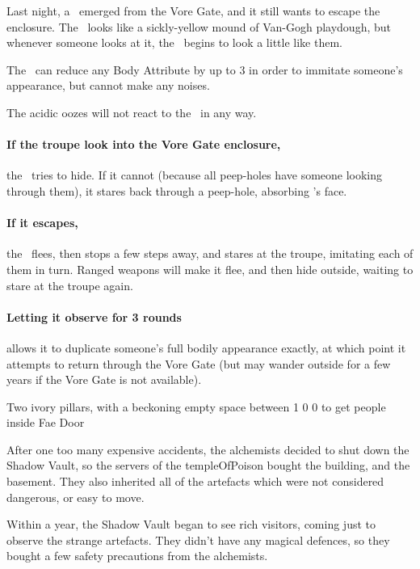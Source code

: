 \setcounter{statDots}{0}
Last night, a \superWierdzi\ emerged from the Vore Gate, and it still wants to escape the enclosure.
The \superWierdzi\ looks like a sickly-yellow mound of Van-Gogh playdough, but whenever someone looks at it, the \superWierdzi\ begins to look a little like them.

\mphlg

The \superWierdzi\ can reduce any Body Attribute by up to 3 in order to immitate someone's appearance, but cannot make any noises.

The acidic oozes will not react to the \superWierdzi\ in any way.

\paragraph{If the troupe look into the Vore Gate enclosure,}
the \superWierdzi\ tries to hide.
If it cannot (because all peep-holes have someone looking through them), it stares back through a peep-hole, absorbing 's face.

\paragraph{If it escapes,}
the \superWierdzi\ flees, then stops a few steps away, and stares at the troupe, imitating each of them in turn.
Ranged weapons will make it flee, and then hide outside, waiting to stare at the troupe again.

\paragraph{Letting it observe for 3 rounds}
allows it to duplicate someone's full bodily appearance exactly, at which point it attempts to return through the Vore Gate (but may wander outside for a few years if the Vore Gate is not available).

  {Two ivory pillars, with a beckoning empty space between}%
  {1}%
  {0}%
  {0}%
  {to get people inside}%
  {Fae Door}%
  {
    \setcounter{Fire}{3}
    \setcounter{Earth}{2}
    \setcounter{Fate}{1}
    \setcounter{Water}{1}
    \setcounter{Academics}{2}
    \setcounter{Wyldcrafting}{1}
  }%

\showStdSpells[
  \setcounter{diceNo}{0}
]


\begin{exampletext}
  After one too many expensive accidents, the alchemists decided to shut down the Shadow Vault, so the \glspl{server} of the \gls{templeOfPoison} bought the building, and the basement.
  They also inherited all of the \glspl{artefact} which were not considered dangerous, or easy to move.

  Within a year, the Shadow Vault began to see rich visitors, coming just to observe the strange \glspl{artefact}.
  They didn't have any magical defences, so they bought a few safety precautions from the alchemists.
\end{exampletext}

